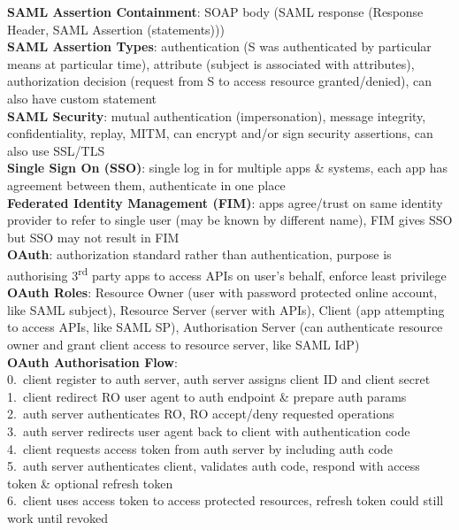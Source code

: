 \documentclass[a4paper]{article}
\begin{document}
\begin{multicols}{2}
        \textbf{SAML Assertion Containment}: SOAP body (SAML response (Response Header, SAML Assertion (statements)))\\
        \textbf{SAML Assertion Types}: authentication (S was authenticated by particular means at particular time), attribute (subject is associated with attributes), authorization decision (request from S to access resource granted/denied), can also have custom statement\\
        \textbf{SAML Security}: mutual authentication (impersonation), message integrity, confidentiality, replay, MITM, can encrypt and/or sign security assertions, can also use SSL/TLS\\
        \textbf{Single Sign On (SSO)}: single log in for multiple apps \& systems, each app has agreement between them, authenticate in one place\\
        \textbf{Federated Identity Management (FIM)}: apps agree/trust on same identity provider to refer to single user (may be known by different name), FIM gives SSO but SSO may not result in FIM\\
        \textbf{OAuth}: authorization standard rather than authentication, purpose is authorising 3\textsuperscript{rd} party apps to access APIs on user's behalf, enforce least privilege\\
        \textbf{OAuth Roles}: Resource Owner (user with password protected online account, like SAML subject), Resource Server (server with APIs), Client (app attempting to access APIs, like SAML SP), Authorisation Server (can authenticate resource owner and grant client access to resource server, like SAML IdP)\\
        \textbf{OAuth Authorisation Flow}:\\
        0.\ client register to auth server, auth server assigns client ID and client secret\\
        1.\ client redirect RO user agent to auth endpoint \& prepare auth params\\
        2.\ auth server authenticates RO, RO accept/deny requested operations\\
        3.\ auth server redirects user agent back to client with authentication code\\
        4.\ client requests access token from auth server by including auth code\\
        5.\ auth server authenticates client, validates auth code, respond with access token \& optional refresh token\\
        6.\ client uses access token to access protected resources, refresh token could still work until revoked\\

\end{multicols}
\end{document}
